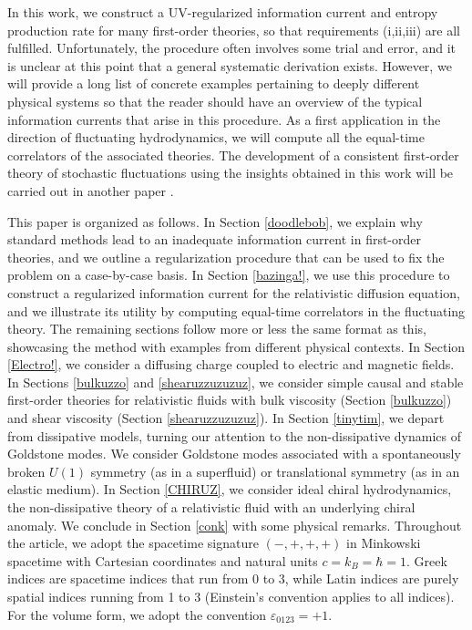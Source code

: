 \documentclass[a4paper, amsfonts, amssymb, amsmath, reprint, showkeys, nofootinbib, twoside,notitlepage,onecolumn,preprintnumbers]{revtex4-2}
\theoremstyle{definition}
\theoremstyle{theorem}
\theoremstyle{corollary}
\begin{document}
In this work, we construct a UV-regularized information current and entropy production rate for many first-order theories, so that requirements (i,ii,iii) are all fulfilled. Unfortunately, the procedure often involves some trial and error, and it is unclear at this point that a general systematic derivation exists. However, we will provide a long list of concrete examples pertaining to deeply different physical systems so that the reader should have an overview of the typical information currents that arise in this procedure. As a first application in the direction of fluctuating hydrodynamics, we will compute all the equal-time correlators of the associated theories. The development of a consistent first-order theory of stochastic fluctuations using the insights obtained in this work will be carried out in another paper \cite{GavassinoFluctatingBDNK2024vyu}. 

This paper is organized as follows. In Section \ref{doodlebob}, we explain why standard methods lead to an inadequate information current in first-order theories, and we outline a regularization procedure that can be used to fix the problem on a case-by-case basis. In Section \ref{bazinga!}, we use this procedure to construct a regularized information current for the relativistic diffusion equation, and we illustrate its utility by computing equal-time correlators in the fluctuating theory. The remaining sections follow more or less the same format as this, showcasing the method with examples from different physical contexts. In Section \ref{Electro!}, we consider a diffusing charge coupled to electric and magnetic fields. In Sections \ref{bulkuzzo} and \ref{shearuzzuzuzuz}, we consider simple causal and stable first-order theories for relativistic fluids with bulk viscosity (Section \ref{bulkuzzo}) and shear viscosity (Section \ref{shearuzzuzuzuz}). In Section \ref{tinytim}, we depart from dissipative models, turning our attention to the non-dissipative dynamics of Goldstone modes. We consider Goldstone modes associated with a spontaneously broken $U(1)$ symmetry (as in a superfluid) or translational symmetry (as in an elastic medium). In Section \ref{CHIRUZ}, we consider ideal chiral hydrodynamics, the non-dissipative theory of a relativistic fluid with an underlying chiral anomaly. We conclude in Section \ref{conk} with some physical remarks. Throughout the article, we adopt the spacetime signature $(-,+,+,+)$ in Minkowski spacetime with Cartesian coordinates and natural units $c=k_B=\hbar=1$. Greek indices are spacetime indices that run from 0 to 3, while Latin indices are purely spatial indices running from 1 to 3 (Einstein's convention applies to all indices). For the volume form, we adopt the convention $\varepsilon_{0123}=+1$.
\end{document}
